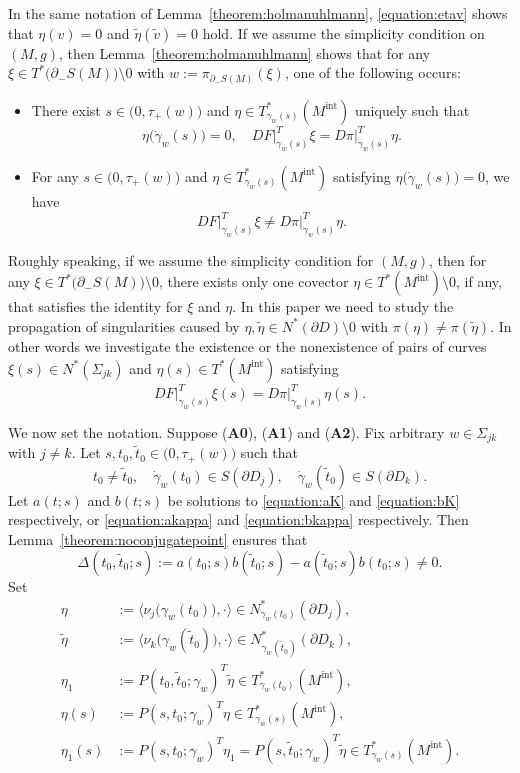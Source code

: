 \documentclass[a4paper,11pt,reqno]{amsart}
\numberwithin{equation}{section}
\theoremstyle{definition}
\theoremstyle{remark}
\begin{document}
%
%
In the same notation of Lemma~\ref{theorem:holmanuhlmann}, 
\eqref{equation:etav} shows that 
$\eta(v)=0$ and $\tilde{\eta}(\tilde{v})=0$ hold. 
If we assume the simplicity condition on $(M,g)$, 
then Lemma~\ref{theorem:holmanuhlmann} shows that 
for any $\xi \in T^\ast\bigl(\partial_-S(M)\bigr)\setminus0$ 
with $w:=\pi_{\partial_-S(M)}(\xi)$, 
one of the following occurs:
%
%
\begin{itemize}
\item 
There exist  
$s \in \bigl(0,\tau_+(w)\bigr)$ and 
$\eta \in T^\ast_{\gamma_w(s)}(M^\text{int})$ uniquely 
such that 
%
%
$$
\eta\bigl(\dot{\gamma}_w(s)\bigr)=0, 
\quad
DF\vert^T_{\dot{\gamma}_w(s)}\xi=D\pi\vert^T_{\dot{\gamma}_w(s)}\eta.
$$
%
% 
\item 
For any $s \in \bigl(0,\tau_+(w)\bigr)$ and 
$\eta \in T^\ast_{\gamma_w(s)}(M^\text{int})$ 
satisfying $\eta\bigl(\dot{\gamma}_w(s)\bigr)=0$, 
we have  
%
%
$$
DF\vert^T_{\dot{\gamma}_w(s)}\xi{\ne}D\pi\vert^T_{\dot{\gamma}_w(s)}\eta. 
$$
%
%
\end{itemize}
%
%
Roughly speaking, 
if we assume the simplicity condition for $(M,g)$, then 
for any $\xi \in T^\ast\bigl(\partial_-S(M)\bigr)\setminus0$, 
there exists only one covector $\eta \in T^\ast(M^\text{int})\setminus0$, if any, that  
satisfies the identity for $\xi$ and $\eta$. In this paper we need to study the propagation of singularities caused by $\eta, \tilde{\eta} \in N^\ast(\partial{D})\setminus0$ with $\pi(\eta)\ne\pi(\tilde{\eta})$. In other words we investigate the existence or the nonexistence 
of pairs of curves  $\xi(s) \in N^\ast(\Sigma_{jk})$ and 
$\eta(s) \in T^\ast(M^\text{int})$ satisfying 
%
%
$$
DF\vert^T_{\dot{\gamma}_w(s)}\xi(s)=D\pi\vert^T_{\dot{\gamma}_w(s)}\eta(s). 
$$ 
%
%
\par
%
%
We now set the notation. 
Suppose ({\bf A0}), ({\bf A1}) and ({\bf A2}). 
Fix arbitrary $w \in \Sigma_{jk}$ with $j{\ne}k$.  
Let $s,t_0,\tilde{t}_0 \in \bigl(0,\tau_+(w)\bigr)$ such that
%
%
$$
t_0\ne\tilde{t}_0,
\quad
\dot{\gamma}_w(t_0) \in S(\partial{D_j}),
\quad
\dot{\gamma}_w(\tilde{t}_0) \in S(\partial{D_k}). 
$$
%
% 
Let $a(t;s)$ and $b(t;s)$ be solutions to 
\eqref{equation:aK} and \eqref{equation:bK} respectively, 
or \eqref{equation:akappa} and \eqref{equation:bkappa} respectively. 
Then Lemma~\ref{theorem:noconjugatepoint} ensures that 
%
%
$$
\Delta(t_0,\tilde{t}_0;s)
:=
a(t_0;s)b(\tilde{t}_0;s)-a(\tilde{t}_0;s)b(t_0;s)
\ne0. 
$$
%
%
Set 
%
%
\begin{align*}
  \eta 
& :=
  \bigl\langle\nu_j\bigl(\gamma_w(t_0)\bigr),\cdot\bigr\rangle 
  \in N^\ast_{\gamma_w(t_0)}(\partial{D_j}),
\\
  \tilde{\eta}
& :=
  \bigl\langle\nu_k\bigl(\gamma_w(\tilde{t}_0)\bigr),\cdot\bigr\rangle 
  \in N^\ast_{\gamma_w(\tilde{t}_0)}(\partial{D_k}),
\\
  \eta_1
& :=
  P(t_0,\tilde{t}_0;\gamma_w)^T\tilde{\eta} 
  \in T^\ast_{\gamma_w(t_0)}(M^\text{int}),
\\
  \eta(s)
& :=
  P(s,t_0;\gamma_w)^T\eta
  \in T^\ast_{\gamma_w(s)}(M^\text{int}),
\\
  \eta_1(s)
& :=
  P(s,t_0;\gamma_w)^T\eta_1
  =
  P(s,\tilde{t}_0;\gamma_w)^T\tilde{\eta}
  \in T^\ast_{\gamma_w(s)}(M^\text{int}). 
\end{align*}
\end{document}
